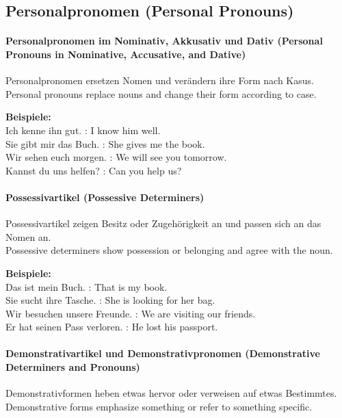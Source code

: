 \documentclass[a4paper]{article}
\begin{document}
    \subsection{Personalpronomen {\small (Personal Pronouns)}}
        
        \paragraph{Personalpronomen im Nominativ, Akkusativ und Dativ {\small (Personal Pronouns in Nominative, Accusative, and Dative)}}
            Personalpronomen ersetzen Nomen und verändern ihre Form nach Kasus.\\
            Personal pronouns replace nouns and change their form according to case.
            
            \textbf{Beispiele:}\\
            Ich kenne ihn gut. : I know him well.\\
            Sie gibt mir das Buch. : She gives me the book.\\
            Wir sehen euch morgen. : We will see you tomorrow.\\
            Kannst du uns helfen? : Can you help us?
        
        \paragraph{Possessivartikel {\small (Possessive Determiners)}}
            Possessivartikel zeigen Besitz oder Zugehörigkeit an und passen sich an das Nomen an.\\
            Possessive determiners show possession or belonging and agree with the noun.
            
            \textbf{Beispiele:}\\
            Das ist mein Buch. : That is my book.\\
            Sie sucht ihre Tasche. : She is looking for her bag.\\
            Wir besuchen unsere Freunde. : We are visiting our friends.\\
            Er hat seinen Pass verloren. : He lost his passport.
        
        \paragraph{Demonstrativartikel und Demonstrativpronomen {\small (Demonstrative Determiners and Pronouns)}}
            Demonstrativformen heben etwas hervor oder verweisen auf etwas Bestimmtes.\\
            Demonstrative forms emphasize something or refer to something specific.
            
\end{document}
